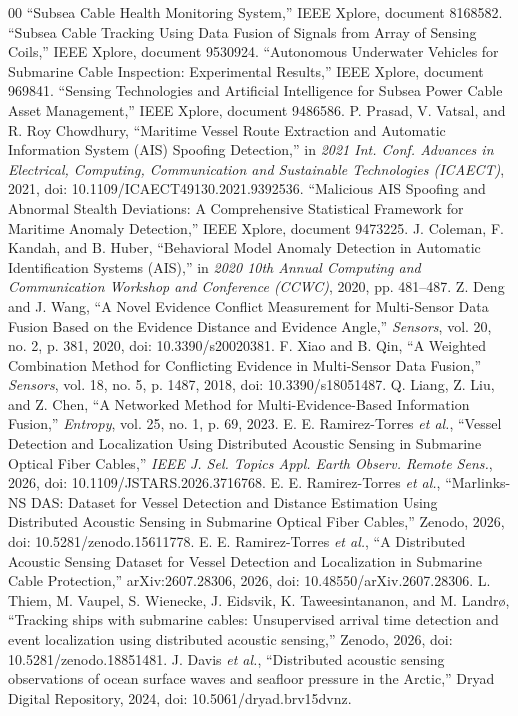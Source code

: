 \documentclass[conference]{IEEEtran}
\begin{document}
\begin{thebibliography}{00}
 ``Subsea Cable Health Monitoring System,'' IEEE Xplore, document 8168582.
 ``Subsea Cable Tracking Using Data Fusion of Signals from Array of Sensing Coils,'' IEEE Xplore, document 9530924.
 ``Autonomous Underwater Vehicles for Submarine Cable Inspection: Experimental Results,'' IEEE Xplore, document 969841.
 ``Sensing Technologies and Artificial Intelligence for Subsea Power Cable Asset Management,'' IEEE Xplore, document 9486586.
 P. Prasad, V. Vatsal, and R. Roy Chowdhury, ``Maritime Vessel Route Extraction and Automatic Information System (AIS) Spoofing Detection,'' in \textit{2021 Int. Conf. Advances in Electrical, Computing, Communication and Sustainable Technologies (ICAECT)}, 2021, doi: 10.1109/ICAECT49130.2021.9392536.
 ``Malicious AIS Spoofing and Abnormal Stealth Deviations: A Comprehensive Statistical Framework for Maritime Anomaly Detection,'' IEEE Xplore, document 9473225.
 J. Coleman, F. Kandah, and B. Huber, ``Behavioral Model Anomaly Detection in Automatic Identification Systems (AIS),'' in \textit{2020 10th Annual Computing and Communication Workshop and Conference (CCWC)}, 2020, pp. 481--487.
 Z. Deng and J. Wang, ``A Novel Evidence Conflict Measurement for Multi-Sensor Data Fusion Based on the Evidence Distance and Evidence Angle,'' \textit{Sensors}, vol. 20, no. 2, p. 381, 2020, doi: 10.3390/s20020381.
 F. Xiao and B. Qin, ``A Weighted Combination Method for Conflicting Evidence in Multi-Sensor Data Fusion,'' \textit{Sensors}, vol. 18, no. 5, p. 1487, 2018, doi: 10.3390/s18051487.
 Q. Liang, Z. Liu, and Z. Chen, ``A Networked Method for Multi-Evidence-Based Information Fusion,'' \textit{Entropy}, vol. 25, no. 1, p. 69, 2023.
 E. E. Ramirez-Torres \textit{et al.}, ``Vessel Detection and Localization Using Distributed Acoustic Sensing in Submarine Optical Fiber Cables,'' \textit{IEEE J. Sel. Topics Appl. Earth Observ. Remote Sens.}, 2026, doi: 10.1109/JSTARS.2026.3716768.
 E. E. Ramirez-Torres \textit{et al.}, ``Marlinks-NS DAS: Dataset for Vessel Detection and Distance Estimation Using Distributed Acoustic Sensing in Submarine Optical Fiber Cables,'' Zenodo, 2026, doi: 10.5281/zenodo.15611778.
 E. E. Ramirez-Torres \textit{et al.}, ``A Distributed Acoustic Sensing Dataset for Vessel Detection and Localization in Submarine Cable Protection,'' arXiv:2607.28306, 2026, doi: 10.48550/arXiv.2607.28306.
 L. Thiem, M. Vaupel, S. Wienecke, J. Eidsvik, K. Taweesintananon, and M. Landr{\o}, ``Tracking ships with submarine cables: Unsupervised arrival time detection and event localization using distributed acoustic sensing,'' Zenodo, 2026, doi: 10.5281/zenodo.18851481.
 J. Davis \textit{et al.}, ``Distributed acoustic sensing observations of ocean surface waves and seafloor pressure in the Arctic,'' Dryad Digital Repository, 2024, doi: 10.5061/dryad.brv15dvnz.
\end{thebibliography}
\end{document}
